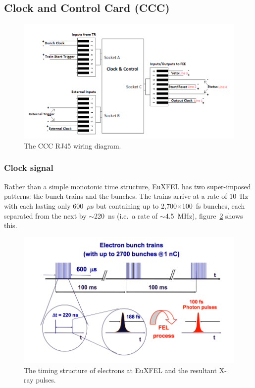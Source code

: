 \subsection{Clock and Control Card (CCC)} %
\label{sub:clock_and_control_card}
\begin{figure}[htbp]
  \centering
    \includegraphics[width=.9\textwidth]{images/Other/CCC_RJ45_diagram.png}
  \caption{The CCC RJ45 wiring diagram.}
  \label{fig:CCC_RJ45_diagram}
\end{figure}

\subsubsection{Clock signal} %
\label{sub:clock_signal}
Rather than a simple monotonic time structure, EuXFEL has two super-imposed patterns: the bunch trains and the bunches. The trains arrive at a rate of 10~Hz with each lasting only 600~\(\mu\)s but containing up to 2,700\( \times\)100~fs bunches, each separated from the next by \(\sim\)220~ns (i.e.\ a rate of \(\sim\)4.5~MHz), figure~\ref{fig:XFEL-time_structure} shows this.
\begin{figure}[htbp]
  \centering
    \includegraphics[width=.9\textwidth]{images/Other/XFEL-time_structure.png}
  \caption{The timing structure of electrons at EuXFEL and the resultant X-ray pulses. }
  \label{fig:XFEL-time_structure}
\end{figure}

